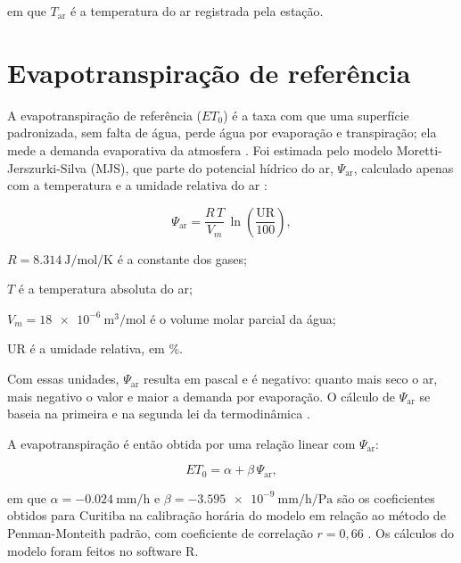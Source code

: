 \documentclass[
12pt,			%
openany,		%
oneside,		%
a4paper,		%
sumario=tradicional,
chapter=TITLE,
section=TITLE,
subsection=Title,
brazil,			%
]{abntex2}
\begin{document}
	\noindent em que $T_{\text{ar}}$ é a temperatura do ar registrada pela estação.
	
	\section{Evapotranspiração de referência}
	
	A evapotranspiração de referência ($ET_0$) é a taxa com que uma superfície padronizada, sem falta de água, perde água por evaporação e transpiração; ela mede a demanda evaporativa da atmosfera \cite{fao}. Foi estimada pelo modelo Moretti-Jerszurki-Silva (MJS), que parte do potencial hídrico do ar, $\Psi_{\mathrm{ar}}$, calculado apenas com a temperatura e a umidade relativa do ar \cite{dossantos2021}:
	
	\begin{equation}
		\Psi_{\mathrm{ar}} = \frac{R \, T}{V_m} \, \ln\left(\frac{\mathrm{UR}}{100}\right),
	\end{equation}
	
	\begin{alineas}
		\item $R = \SI{8.314}{\joule\per\mole\per\kelvin}$ é a constante dos gases;
		\item $T$ é a temperatura absoluta do ar;
		\item $V_m = \SI{18e-6}{\cubic\metre\per\mole}$ é o volume molar parcial da água;
		\item $\mathrm{UR}$ é a umidade relativa, em \%.
	\end{alineas}
	
	Com essas unidades, $\Psi_{\mathrm{ar}}$ resulta em pascal e é negativo: quanto mais seco o ar, mais negativo o valor e maior a demanda por evaporação. O cálculo de $\Psi_{\mathrm{ar}}$ se baseia na primeira e na segunda lei da termodinâmica \cite{dossantos2021}.
	
	A evapotranspiração é então obtida por uma relação linear com $\Psi_{\mathrm{ar}}$:
	
	\begin{equation}
		ET_0 = \alpha + \beta \, \Psi_{\mathrm{ar}},
	\end{equation}
	
	\noindent em que $\alpha = \SI{-0.024}{\milli\metre\per\hour}$ e $\beta = \SI{-3.595e-9}{\milli\metre\per\hour\per\pascal}$ são os coeficientes obtidos para Curitiba na calibração horária do modelo em relação ao método de Penman-Monteith padrão, com coeficiente de correlação $r = 0{,}66$ \cite{dossantos2021}. Os cálculos do modelo foram feitos no software R.
	
\end{document}
